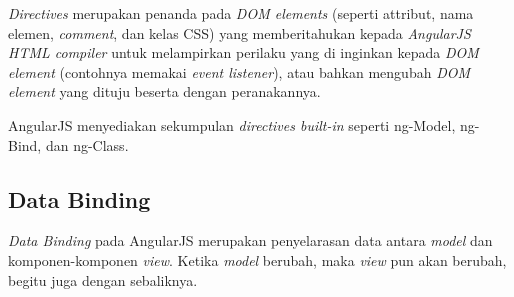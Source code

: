	\textit{Directives} merupakan penanda pada \textit{DOM elements} (seperti attribut, nama elemen, \textit{comment},  dan kelas CSS) yang memberitahukan kepada \textit{AngularJS HTML compiler} untuk melampirkan perilaku yang di inginkan kepada \textit{DOM element} (contohnya memakai \textit{event listener}), atau bahkan mengubah \textit{DOM element} yang dituju beserta dengan peranakannya.
	
	AngularJS menyediakan sekumpulan \textit{directives built-in} seperti ng-Model, ng-Bind, dan ng-Class. 
	


\subsection{Data Binding}
\label{sub: dataBinding}
	
	\textit{Data Binding} pada AngularJS merupakan penyelarasan data antara \textit{model} dan komponen-komponen \textit{view}. Ketika \textit{model} berubah, maka \textit{view} pun akan berubah, begitu juga dengan sebaliknya.
	
